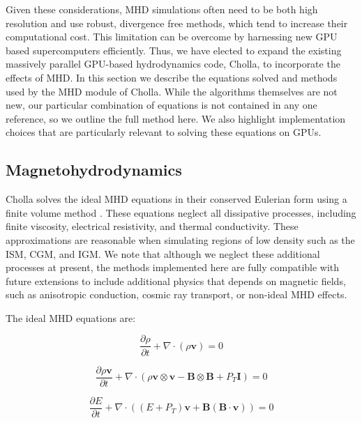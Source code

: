\documentclass[modern, linenumbers]{aastex631}
\begin{document}
Given these considerations, MHD simulations often need to be both high resolution and use robust, divergence free methods, which tend to increase their computational cost. This limitation can be overcome by harnessing new GPU based supercomputers efficiently. Thus, we have elected to expand the existing massively parallel GPU-based hydrodynamics code, Cholla, to incorporate the effects of MHD. In this section we describe the equations solved and methods used by the MHD module of Cholla. While the algorithms themselves are not new, our particular combination of equations is not contained in any one reference, so we outline the full method here. We also highlight implementation choices that are particularly relevant to solving these equations on GPUs.

\subsection{Magnetohydrodynamics}
\label{sec:methods-mhd}

Cholla solves the ideal MHD equations in their conserved Eulerian form using a finite volume method \citep{Godunov}. These equations neglect all dissipative processes, including finite viscosity, electrical resistivity, and thermal conductivity. These approximations are reasonable when simulating regions of low density such as the ISM, CGM, and IGM. We note that although we neglect these additional processes at present, the methods implemented here are fully compatible with future extensions to include additional physics that depends on magnetic fields, such as anisotropic conduction, cosmic ray transport, or non-ideal MHD effects.

The ideal MHD equations are:

\begin{equation}
    \label{eqn:mass-conservation}
    \frac{\partial \rho}{\partial t} + \nabla \cdot (\rho \boldsymbol{v}) = 0
\end{equation}

\begin{equation}
    \label{eqn:momentum-conservation}
    \frac{\partial \rho\boldsymbol{v}}{\partial t} + \nabla \cdot (\rho \boldsymbol{v}\otimes\boldsymbol{v} - \boldsymbol{B}\otimes\boldsymbol{B} + P_T\boldsymbol{I}) = 0
\end{equation}

\begin{equation}
    \label{eqn:energy-conservation}
    \frac{\partial E}{\partial t} + \nabla \cdot ( (E + P_T) \boldsymbol{v} + \boldsymbol{B}(\boldsymbol{B}\cdot\boldsymbol{v}) ) = 0
\end{equation}
\end{document}
